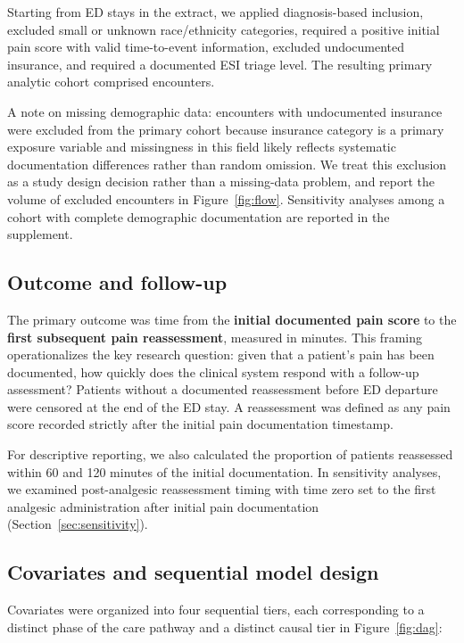 Starting from \FlowAllED{} ED stays in the extract, we applied diagnosis-based inclusion, excluded small or unknown race/ethnicity categories, required a positive initial pain score with valid time-to-event information, excluded undocumented insurance, and required a documented ESI triage level.
The resulting primary analytic cohort comprised \CohortN{} encounters.

A note on missing demographic data: encounters with undocumented insurance were excluded from the primary cohort because insurance category is a primary exposure variable and missingness in this field likely reflects systematic documentation differences rather than random omission.
We treat this exclusion as a study design decision rather than a missing-data problem, and report the volume of excluded encounters in Figure~\ref{fig:flow}.
Sensitivity analyses among a cohort with complete demographic documentation are reported in the supplement.

\subsection{Outcome and follow-up}

The primary outcome was time from the \textbf{initial documented pain score} to the \textbf{first subsequent pain reassessment}, measured in minutes.
This framing operationalizes the key research question: given that a patient's pain has been documented, how quickly does the clinical system respond with a follow-up assessment?
Patients without a documented reassessment before ED departure were censored at the end of the ED stay.
A reassessment was defined as any pain score recorded strictly after the initial pain documentation timestamp.

For descriptive reporting, we also calculated the proportion of patients reassessed within 60 and 120 minutes of the initial documentation.
In sensitivity analyses, we examined post-analgesic reassessment timing with time zero set to the first analgesic administration after initial pain documentation (Section~\ref{sec:sensitivity}).

\subsection{Covariates and sequential model design}

Covariates were organized into four sequential tiers, each corresponding to a distinct phase of the care pathway and a distinct causal tier in Figure~\ref{fig:dag}:

